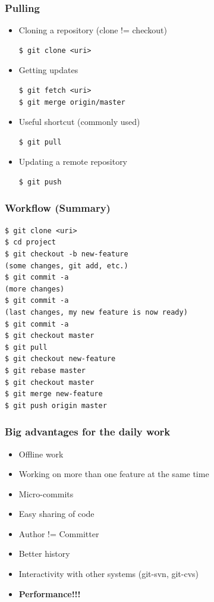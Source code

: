 \begin{frame}[fragile]
  \frametitle{Pulling}

  \begin{itemize}
  \item Cloning a repository (clone != checkout)
    {\scriptsize
\begin{verbatim}
$ git clone <uri>
\end{verbatim}
    }

  \item Getting updates
    {\scriptsize
\begin{verbatim}
$ git fetch <uri>
$ git merge origin/master
\end{verbatim}
    }

  \item Useful shortcut (commonly used)
    {\scriptsize
\begin{verbatim}
$ git pull
\end{verbatim}
    }

  \item Updating a remote repository
    {\scriptsize
\begin{verbatim}
$ git push
\end{verbatim}
    }

  \end{itemize}
\end{frame}

\begin{frame}[fragile]
  \frametitle{Workflow (Summary)}
  {\scriptsize
\begin{verbatim}
$ git clone <uri>
$ cd project
$ git checkout -b new-feature
(some changes, git add, etc.)
$ git commit -a
(more changes)
$ git commit -a
(last changes, my new feature is now ready)
$ git commit -a
$ git checkout master
$ git pull
$ git checkout new-feature
$ git rebase master
$ git checkout master
$ git merge new-feature
$ git push origin master
\end{verbatim}
  }
\end{frame}

\begin{frame}
  \frametitle{Big advantages for the daily work}

  \begin{itemize}
  \item Offline work
    \pause
  \item Working on more than one feature at the same time
    \pause
  \item Micro-commits
    \pause
  \item Easy sharing of code
    \pause
  \item Author != Committer
    \pause
  \item Better history
    \pause
  \item Interactivity with other systems (git-svn, git-cvs)
    \pause
  \item {\bf Performance!!!}
  \end{itemize}
\end{frame}

